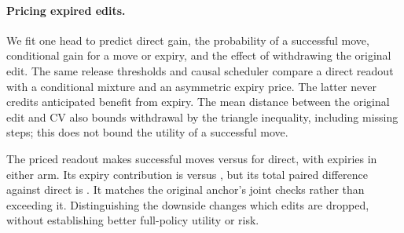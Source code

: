 \paragraph{Pricing expired edits.}
We fit one head to predict direct gain, the probability of a successful
move, conditional gain for a move or expiry, and the effect of withdrawing
the original edit. The same release thresholds and causal scheduler
compare a direct readout with a conditional mixture and an asymmetric
expiry price. The latter never credits anticipated benefit from expiry.
The mean distance between the original edit and CV also bounds
withdrawal by the triangle inequality, including missing steps; this
does not bound the utility of a successful move.

The priced readout makes \ExpiryMoves{} successful moves versus
\ExpiryDirectMoves{} for direct, with \ExpiryCount{} expiries in either
arm. Its expiry contribution is \ExpiryPriced{} versus \ExpiryDirect{},
but its total paired difference against direct is \ExpiryEffect{}.
It matches the original anchor's \ExpiryJoint{} joint checks rather
than exceeding it. Distinguishing the downside changes which edits
are dropped, without establishing better full-policy utility or risk.
